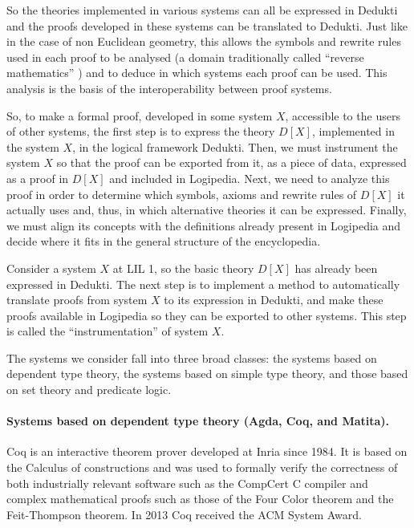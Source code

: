 So the theories implemented in various systems can all be expressed in
Dedukti and the proofs developed in these systems can be translated to
Dedukti. Just like in the case of non Euclidean geometry, this allows
the symbols and rewrite rules used in each proof to be analysed
\cite{Thire18,Dowek17} (a domain traditionally called ``reverse
mathematics'' \cite{Friedman76,Simpson09}) and to deduce in which
systems each proof can be used.  This analysis is the basis of the
interoperability between proof systems.

So, to make a formal proof, developed in some system $X$, accessible
to the users of other systems, the first step is to express the theory
$D[X]$, implemented in the system $X$, in the logical framework
Dedukti.  Then, we must instrument the system $X$ so that the proof
can be exported from it, as a piece of data, expressed as a proof in
$D[X]$ and included in Logipedia. Next, we need to analyze this proof
in order to determine which symbols, axioms and rewrite rules of
$D[X]$ it actually uses and, thus, in which alternative theories it
can be expressed.  Finally, we must align its concepts with the
definitions already present in Logipedia and decide where it fits in
the general structure of the encyclopedia.


Consider a system $X$ at LIL 1, so the basic theory $D[X]$ has already
been expressed in Dedukti. The next step is to implement a method to
automatically translate proofs from system $X$ to its expression in
Dedukti, and make these proofs available in Logipedia so they can be
exported to other systems. This step is called the
``instrumentation'' of system $X$.

The systems we consider fall into three broad classes: the systems
based on dependent type theory, the systems based on simple type
theory, and those based on set theory and predicate logic.

\paragraph*{Systems based on dependent type theory (Agda, Coq, and Matita).}

Coq is an interactive theorem prover developed at Inria since 1984.
It is based on the Calculus of constructions and was used to formally
verify the correctness of both industrially relevant software such as
the CompCert C compiler and complex mathematical proofs such as those
of the Four Color theorem and the Feit-Thompson theorem. In 2013 Coq
received the ACM System Award.

